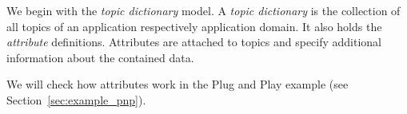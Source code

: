 We begin with the \emph{topic dictionary} model.
A \emph{topic dictionary} is the collection of all topics of an application respectively application domain.
It also holds the \emph{attribute} definitions.
Attributes are attached to topics and specify additional information about the contained data.

%
%
We will check how attributes work in the Plug and Play example (see Section~\ref{sec:example_pnp}). 

